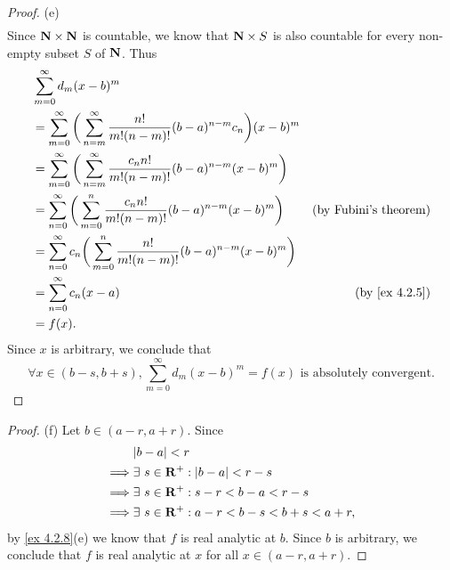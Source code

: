 \begin{proof}{(e)}
\begin{align*}
  \end{align*}
  Since \(\mathbf{N} \times \mathbf{N}\) is countable, we know that \(\mathbf{N} \times S\) is also countable for every non-empty subset \(S\) of \(\mathbf{N}\).
  Thus
  \begin{align*}
     & \sum_{m = 0}^\infty d_m (x - b)^m                                                                                                         \\
     & = \sum_{m = 0}^\infty \bigg(\sum_{n = m}^\infty \frac{n!}{m! (n - m)!} (b - a)^{n - m} c_n\bigg) (x - b)^m                                \\
     & = \sum_{m = 0}^\infty \bigg(\sum_{n = m}^\infty \frac{c_n n!}{m! (n - m)!} (b - a)^{n - m} (x - b)^m\bigg)                                \\
     & = \sum_{n = 0}^\infty \bigg(\sum_{m = 0}^n \frac{c_n n!}{m! (n - m)!} (b - a)^{n - m} (x - b)^m\bigg)      & \text{(by Fubini's theorem)} \\
     & = \sum_{n = 0}^\infty c_n \bigg(\sum_{m = 0}^n \frac{n!}{m! (n - m)!} (b - a)^{n - m} (x - b)^m\bigg)                                     \\
     & = \sum_{n = 0}^\infty c_n (x - a)                                                                          & \text{(by \cref{ex 4.2.5})}  \\
     & = f(x).
  \end{align*}
  Since \(x\) is arbitrary, we conclude that
  \[
    \forall x \in (b - s, b + s), \sum_{m = 0}^\infty d_m (x - b)^m = f(x) \text{ is absolutely convergent}.
  \]
\end{proof}

\begin{proof}{(f)}
  Let \(b \in (a - r, a + r)\).
  Since
  \begin{align*}
             & \abs{b - a} < r                                      \\
    \implies & \exists\ s \in \R^+ : \abs{b - a} < r - s            \\
    \implies & \exists\ s \in \R^+ : s - r < b - a < r - s          \\
    \implies & \exists\ s \in \R^+ : a - r < b - s < b + s < a + r,
  \end{align*}
  by \cref{ex 4.2.8}(e) we know that \(f\) is real analytic at \(b\).
  Since \(b\) is arbitrary, we conclude that \(f\) is real analytic at \(x\) for all \(x \in (a - r, a + r)\).
\end{proof}